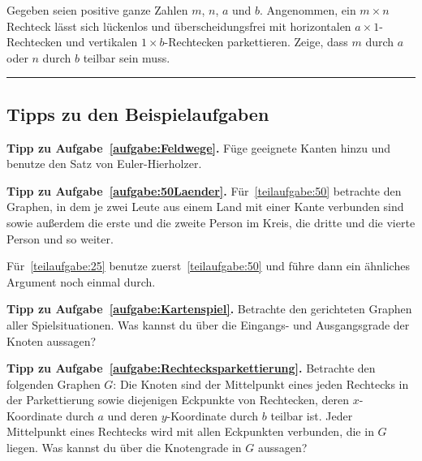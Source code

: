 \begin{aufgabe*}[***]\label{aufgabe:Rechtecksparkettierung}
	Gegeben seien positive ganze Zahlen $m$, $n$, $a$ und $b$. Angenommen, ein $m\times n$ Rechteck lässt sich lückenlos und überscheidungsfrei mit horizontalen $a\times1$-Rechtecken und vertikalen $1\times b$-Rechtecken parkettieren. Zeige, dass $m$ durch $a$ oder $n$ durch $b$ teilbar sein muss.
\end{aufgabe*}

\vfill\hrule\vspace{-1em}

\subsection*{Tipps zu den Beispielaufgaben}
\textbf{Tipp zu Aufgabe~\ref{aufgabe:Feldwege}.} Füge geeignete Kanten hinzu und benutze den Satz von Euler-Hierholzer.

\textbf{Tipp zu Aufgabe~\ref{aufgabe:50Laender}.} Für~\ref{teilaufgabe:50} betrachte den Graphen, in dem je zwei Leute aus einem Land mit einer Kante verbunden sind sowie außerdem die erste und die zweite Person im Kreis, die dritte und die vierte Person und so weiter.

Für~\ref{teilaufgabe:25} benutze zuerst~\ref{teilaufgabe:50} und führe dann ein ähnliches Argument noch einmal durch.

\textbf{Tipp zu Aufgabe~\ref{aufgabe:Kartenspiel}.} Betrachte den gerichteten Graphen aller Spielsituationen. Was kannst du über die Eingangs- und Ausgangsgrade der Knoten aussagen?

\textbf{Tipp zu Aufgabe~\ref{aufgabe:Rechtecksparkettierung}.} Betrachte den folgenden Graphen $G$: Die Knoten sind der Mittelpunkt eines jeden Rechtecks in der Parkettierung sowie diejenigen Eckpunkte von Rechtecken, deren $x$-Koordinate durch $a$ und deren $y$-Koordinate durch $b$ teilbar ist. Jeder Mittelpunkt eines Rechtecks wird mit allen Eckpunkten verbunden, die in $G$ liegen. Was kannst du über die Knotengrade in $G$ aussagen?
